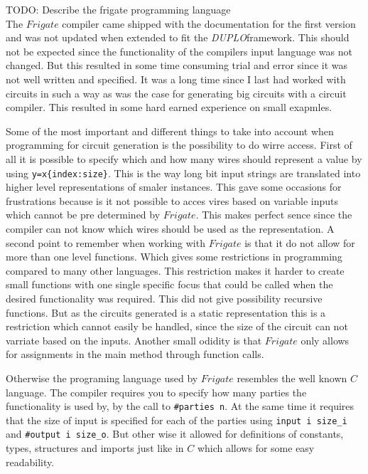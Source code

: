 \documentclass[twoside,11pt,openright]{report}
\newcommand{\todo}[1]{}
\renewcommand{\todo}[1]{{\color{red} TODO: {#1}} \\}
\newcommand{\DUPLO}{\textit{DUPLO}}
\begin{document}
\todo{Describe the frigate programming language}
The $Frigate$ compiler came shipped with the documentation for the first version and was not updated when extended to fit the \DUPLO framework. This should not be expected since the functionality of the compilers input language was not changed. But this resulted in some time consuming trial and error since it was not well written and specified. It was a long time since I last had worked with circuits in such a way as was the case for generating big circuits with a circuit compiler. This resulted in some hard earned experience on small exapmles.

Some of the most important and different things to take into account when programming for circuit generation is the possibility to do wirre access. First of all it is possible to specify which and how many wires should represent a value by using \verb|y=x{index:size}|. This is the way long bit input strings are translated into higher level representations of smaler instances. This gave some occasions for frustrations because is it not possible to acces vires based on variable inputs which cannot be pre determined by $Frigate$. This makes perfect sence since the compiler can not know which wires should be used as the representation.
A second point to remember when working with $Frigate$ is that it do not allow for more than one level functions. Which gives some restrictions in programming compared to many other languages. This restriction makes it harder to create small functions with one single specific focus that could be called when the desired functionality was required. This did not give possibility recursive functions. But as the circuits generated is a static representation this is a restriction which cannot easily be handled, since the size of the circuit can not varriate based on the inputs. Another small odidity is that $Frigate$ only allows for assignments in the main method through function calls.

Otherwise the programing language used by $Frigate$ resembles the well known $C$ language. The compiler requires you to specify how many parties the functionality is used by, by the call to \verb|#parties n|. At the same time it requires that the size of input is specified for each of the parties using \verb|input i size_i| and \verb|#output i size_o|. But other wise it allowed for definitions of constants, types, structures and imports just like in $C$ which allows for some easy readability.

\bigskip
\end{document}
